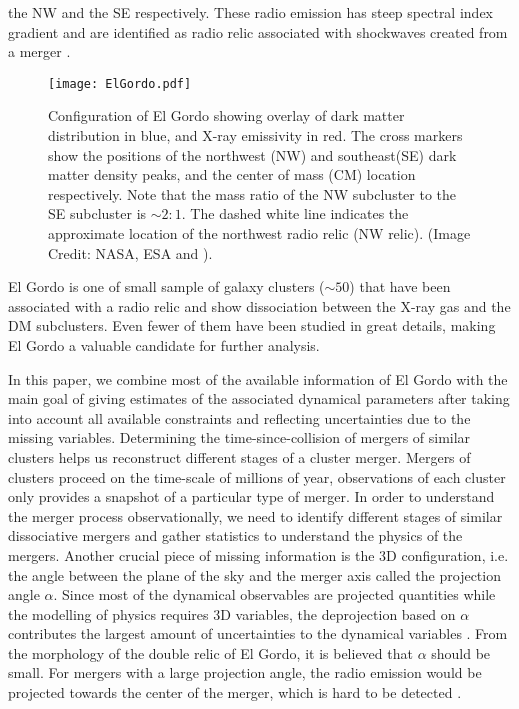 the NW and the SE respectively. These radio emission has steep spectral
index gradient and are identified as radio relic associated with shockwaves
created from a merger \citep{L13}. 
\begin{figure}
	\texttt{[image: ElGordo.pdf]}
	\caption{Configuration of El Gordo showing overlay of dark
		matter distribution in blue, and X-ray emissivity in red. The cross
		markers show the positions of the northwest (NW) and southeast(SE) dark
		matter density peaks, and the center of mass (CM) location respectively.   
		Note that the mass ratio of the NW subcluster to the SE subcluster is
		$\sim 2:1$.
		The dashed white line indicates the approximate location of the northwest 
		radio relic (NW relic).
		(Image Credit: NASA, ESA and \citealt{Jee13}). 
		\label{fig:config}}
\end{figure}
El Gordo is one of small sample of galaxy clusters ($\sim50$) that have
been associated with a radio relic and show dissociation between the X-ray
gas and the DM subclusters. Even fewer of them have been studied in
great details, making El Gordo a valuable candidate for further analysis.\par 
In this paper, we combine most of the available information of El Gordo
with the main goal of giving estimates of
the associated dynamical parameters after taking into account all available
constraints and reflecting uncertainties due to the missing variables.
Determining the time-since-collision of mergers of similar clusters helps
us reconstruct different stages of a cluster merger.
Mergers of clusters proceed on the time-scale of millions of year,
observations of each cluster only provides a snapshot of a particular type
of merger. In order to understand the merger process observationally, 
we need to identify different stages of similar dissociative mergers and
gather statistics to understand the physics of the mergers.  
Another crucial piece of missing information is the 3D
configuration, i.e. the angle between the plane of the sky and the merger
axis called the projection angle $\alpha$. Since most of the dynamical
observables are projected quantities while the modelling of physics
requires 3D
variables, the deprojection based on $\alpha$ contributes the
largest amount of uncertainties to the dynamical variables .
From the morphology of the double relic of El Gordo, it is believed that
$\alpha$ should be small. For mergers with a
large projection angle, the radio emission would be projected towards the
center of the merger, which is hard to be detected \citep{Vazza11}.

